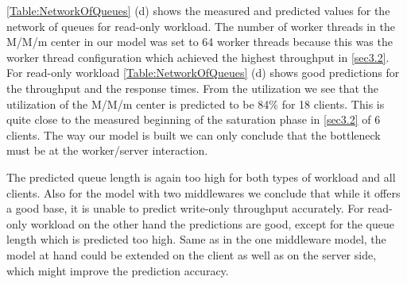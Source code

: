 \documentclass[11pt,a4paper]{article}
\begin{document}
\autoref{Table:NetworkOfQueues} (d) shows the measured and predicted values for the network of queues for read-only workload. The number of worker threads in the M/M/m center in our model was set to 64 worker threads because this was the worker thread configuration which achieved the highest throughput in \autoref{sec3.2}. For read-only workload \autoref{Table:NetworkOfQueues} (d) shows good predictions for the throughput and the response times.
From the utilization we see that the utilization of the M/M/m center is predicted to be 84\% for 18 clients. This is quite close to the measured beginning of the saturation phase in \autoref{sec3.2} of 6 clients. The way our model is built we can only conclude that the bottleneck must be at the worker/server interaction.


The predicted queue length is again too high for both types of workload and all clients.
Also for the model with two middlewares we conclude that while it offers a good base, it is unable to predict write-only throughput accurately. For read-only workload on the other hand the predictions are good, except for the queue length which is predicted too high. Same as in the one middleware model, the model at hand could be extended on the client as well as on the server side, which might improve the prediction accuracy.
\end{document}
